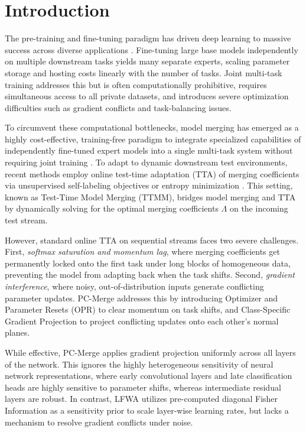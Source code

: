 \documentclass{article}
\theoremstyle{plain}
\theoremstyle{definition}
\theoremstyle{remark}
\begin{document}
\printAffiliationsAndNotice{}

\section{Introduction}
\label{submission-introduction}
The pre-training and fine-tuning paradigm has driven deep learning to massive success across diverse applications \cite{resnet18}. Fine-tuning large base models independently on multiple downstream tasks yields many separate experts, scaling parameter storage and hosting costs linearly with the number of tasks. Joint multi-task training addresses this but is often computationally prohibitive, requires simultaneous access to all private datasets, and introduces severe optimization difficulties such as gradient conflicts and task-balancing issues.

To circumvent these computational bottlenecks, model merging has emerged as a highly cost-effective, training-free paradigm to integrate specialized capabilities of independently fine-tuned expert models into a single multi-task system without requiring joint training \cite{task_arithmetic, ties_merge}. To adapt to dynamic downstream test environments, recent methods employ online test-time adaptation (TTA) of merging coefficients via unsupervised self-labeling objectives or entropy minimization \cite{adamerging, s2c_merge}. This setting, known as Test-Time Model Merging (TTMM), bridges model merging and TTA by dynamically solving for the optimal merging coefficients $\Lambda$ on the incoming test stream.

However, standard online TTA on sequential streams faces two severe challenges. First, \textit{softmax saturation and momentum lag}, where merging coefficients get permanently locked onto the first task under long blocks of homogeneous data, preventing the model from adapting back when the task shifts. Second, \textit{gradient interference}, where noisy, out-of-distribution inputs generate conflicting parameter updates. PC-Merge \cite{pc_merge} addresses this by introducing Optimizer and Parameter Resets (OPR) to clear momentum on task shifts, and Class-Specific Gradient Projection to project conflicting updates onto each other's normal planes. 

While effective, PC-Merge applies gradient projection uniformly across all layers of the network. This ignores the highly heterogeneous sensitivity of neural network representations, where early convolutional layers and late classification heads are highly sensitive to parameter shifts, whereas intermediate residual layers are robust. In contrast, LFWA \cite{lfwa} utilizes pre-computed diagonal Fisher Information as a sensitivity prior to scale layer-wise learning rates, but lacks a mechanism to resolve gradient conflicts under noise.
\end{document}
